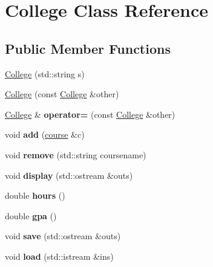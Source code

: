 \hypertarget{classCollege}{\section{College Class Reference}
\label{classCollege}
}
\subsection*{Public Member Functions}
\begin{DoxyCompactItemize}
\item 
\hyperlink{classCollege_adabaf4087355e83f9f7d39f1e1498b41}{College} (std\-::string s)
\item 
\hyperlink{classCollege_ad007ad488e5a7ef986114080d0c8e101}{College} (const \hyperlink{classCollege}{College} \&other)
\item 
\hypertarget{classCollege_af2194c9b37f80d13dc3fdba6784b18e8}{\hyperlink{classCollege}{College} \& {\bfseries operator=} (const \hyperlink{classCollege}{College} \&other)}\label{classCollege_af2194c9b37f80d13dc3fdba6784b18e8}

\item 
\hypertarget{classCollege_a67fd1d8970b46b24ce2e0dd72598a22f}{void {\bfseries add} (\hyperlink{classcourse}{course} \&c)}\label{classCollege_a67fd1d8970b46b24ce2e0dd72598a22f}

\item 
\hypertarget{classCollege_a4d2ae513b36e6421fb1ca2c08459cfe6}{void {\bfseries remove} (std\-::string coursename)}\label{classCollege_a4d2ae513b36e6421fb1ca2c08459cfe6}

\item 
\hypertarget{classCollege_a52ca0a164483cf5c05591cd0fb8b300c}{void {\bfseries display} (std\-::ostream \&outs)}\label{classCollege_a52ca0a164483cf5c05591cd0fb8b300c}

\item 
\hypertarget{classCollege_a8a7a762611a1d7e00c453390d49355fd}{double {\bfseries hours} ()}\label{classCollege_a8a7a762611a1d7e00c453390d49355fd}

\item 
\hypertarget{classCollege_aaf9bfaa0bc717e96da6365661a96fcd0}{double {\bfseries gpa} ()}\label{classCollege_aaf9bfaa0bc717e96da6365661a96fcd0}

\item 
\hypertarget{classCollege_af6b419f813bc990c0e11f99b78a26899}{void {\bfseries save} (std\-::ostream \&outs)}\label{classCollege_af6b419f813bc990c0e11f99b78a26899}

\item 
\hypertarget{classCollege_a11422094ddd907705daede7aa537dd73}{void {\bfseries load} (std\-::istream \&ins)}\label{classCollege_a11422094ddd907705daede7aa537dd73}

\end{DoxyCompactItemize}


